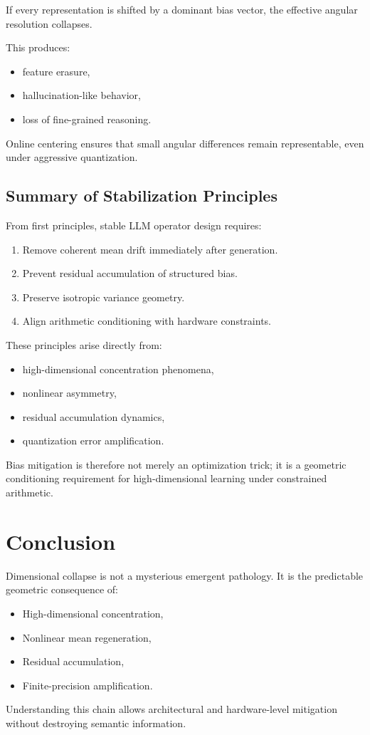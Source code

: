 If every representation is shifted by a dominant bias vector,
the effective angular resolution collapses.

This produces:
\begin{itemize}
\item feature erasure,
\item hallucination-like behavior,
\item loss of fine-grained reasoning.
\end{itemize}

Online centering ensures that
small angular differences remain representable,
even under aggressive quantization.

\subsection{Summary of Stabilization Principles}

From first principles, stable LLM operator design requires:

\begin{enumerate}
\item Remove coherent mean drift immediately after generation.
\item Prevent residual accumulation of structured bias.
\item Preserve isotropic variance geometry.
\item Align arithmetic conditioning with hardware constraints.
\end{enumerate}

These principles arise directly from:
\begin{itemize}
\item high-dimensional concentration phenomena,
\item nonlinear asymmetry,
\item residual accumulation dynamics,
\item quantization error amplification.
\end{itemize}

Bias mitigation is therefore not merely an optimization trick;
it is a geometric conditioning requirement
for high-dimensional learning under constrained arithmetic.


\section{Conclusion}

Dimensional collapse is not a mysterious emergent pathology.
It is the predictable geometric consequence of:

\begin{itemize}
\item High-dimensional concentration,
\item Nonlinear mean regeneration,
\item Residual accumulation,
\item Finite-precision amplification.
\end{itemize}

Understanding this chain allows architectural and hardware-level mitigation
without destroying semantic information.